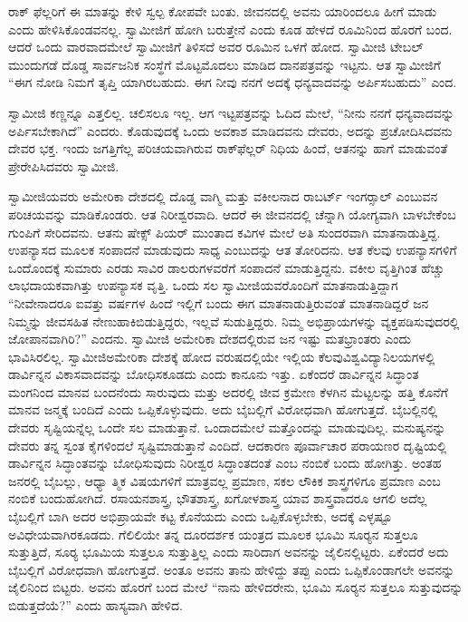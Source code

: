  ರಾಕ್ ಫೆಲ್ಲರಿಗೆ ಈ ಮಾತನ್ನು ಕೇಳಿ ಸ್ವಲ್ಪ ಕೋಪವೇ ಬಂತು. ಜೀವನದಲ್ಲಿ ಅವನು ಯಾರಿಂದಲೂ ಹೀಗೆ ಮಾಡು ಎಂದು ಹೇಳಿಸಿಕೊಂಡವನಲ್ಲ. ಸ್ವಾಮೀಜಿಗೆ ಹೋಗಿ ಬರುತ್ತೇನೆ ಎಂದು ಕೂಡ ಹೇಳದೆ ರೂಮಿನಿಂದ ಹೊರಗೆ ಬಂದ. ಆದರೆ ಒಂದು ವಾರವಾದಮೇಲೆ ಸ್ವಾಮೀಜಿಗೆ ತಿಳಿಸದೆ ಅವರ ರೂಮಿನ ಒಳಗೆ ಹೋದ. ಸ್ವಾಮೀಜಿ ಟೇಬಲ್ ಮುಂದುಗಡೆ ದೊಡ್ಡ ಸಾರ್ವಜನಿಕ ಸಂಸ್ಥೆಗೆ ಮೊಟ್ಟಮೊದಲು ಮಾಡಿದ ದಾನಪತ್ರವನ್ನು ಇಟ್ಟನು. ಆತ ಸ್ವಾಮೀಜಿಗೆ “ಈಗ ನೋಡಿ ನಿಮಗೆ ತೃಪ್ತಿ ಯಾಗಿರಬಹುದು. ಈಗ ನೀವು ನನಗೆ ಅದಕ್ಕೆ ಧನ್ಯವಾದವನ್ನು ಅರ್ಪಿಸಬಹುದು” ಎಂದ. 

 ಸ್ವಾಮೀಜಿ ಕಣ್ಣನ್ನೂ ಎತ್ತಲಿಲ್ಲ. ಚಲಿಸಲೂ ಇಲ್ಲ. ಆಗ ಇಟ್ಟಪತ್ರವನ್ನು ಓದಿದ ಮೇಲೆ, “ನೀನು ನನಗೆ ಧನ್ಯವಾದವನ್ನು ಅರ್ಪಿಸಬೇಕಾಗಿದೆ” ಎಂದರು. ಕೊಡುವುದಕ್ಕೆ ಒಂದು ಅವಕಾಶ ಮಾಡಿದವನು ದೇವರು, ಅದನ್ನು ಪ್ರಚೋದಿಸಿದವನು ದೇವರ ಭಕ್ತ. ಇಂದು ಜಗತ್ತಿಗೆಲ್ಲ ಪರಿಚಯವಾಗಿರುವ ರಾಕ್‍ಫೆಲ್ಲರ್ ನಿಧಿಯ ಹಿಂದೆ, ಆತನನ್ನು ಹಾಗೆ ಮಾಡುವಂತೆ ಪ್ರೇರೇಪಿಸಿದವರು ಸ್ವಾಮೀಜಿ. 

 ಸ್ವಾಮೀಜಿಯವರು ಅಮೇರಿಕಾ ದೇಶದಲ್ಲಿ ದೊಡ್ಡ ವಾಗ್ಮಿ ಮತ್ತು ವಕೀಲನಾದ ರಾಬರ್ಟ್ ಇಂಗರ್‍ಸಾಲ್ ಎಂಬುವನ ಪರಿಚಯವನ್ನು ಮಾಡಿಕೊಂಡರು. ಆತ ನಿರೀಶ್ವರವಾದಿ. ಆದರೆ ಈ ಜೀವನದಲ್ಲಿ ಚೆನ್ನಾಗಿ ಯೋಗ್ಯವಾಗಿ ಬಾಳಬೇಕೆಂಬ ಗುಂಪಿಗೆ ಸೇರಿದವನು. ಆತನು ಷೇಕ್ಸ್ ಪಿಯರ್ ಮುಂತಾದ ಕವಿಗಳ ಮೇಲೆ ಅತಿ ಸುಂದರವಾಗಿ ಮಾತನಾಡುತ್ತಿದ್ದ. ಉಪನ್ಯಾಸದ ಮೂಲಕ ಸಂಪಾದನೆ ಮಾಡುವುದು ಸಾಧ್ಯ ಎಂಬುದನ್ನು ಆತ ತೋರಿದನು. ಆತ ಕೆಲವು ಉಪನ್ಯಾಸಗಳಿಗೆ ಒಂದೊಂದಕ್ಕೆ ಸುಮಾರು ಎರಡು ಸಾವಿರ ಡಾಲರುಗಳವರೆಗೆ ಸಂಪಾದನೆ ಮಾಡುತ್ತಿದ್ದನು. ವಕೀಲ ವೃತ್ತಿಗಿಂತ ಹೆಚ್ಚು ಲಾಭದಾಯಕವಾಗಿತ್ತು ಉಪನ್ಯಾಸಕ ವೃತ್ತಿ. ಒಂದು ಸಲ ಸ್ವಾಮೀಜಿಯವರೊಂದಿಗೆ ಮಾತನಾಡುತ್ತಿದ್ದಾಗ “ನೀವೇನಾದರೂ ಐವತ್ತು ವರ್ಷಗಳ ಹಿಂದೆ ಇಲ್ಲಿಗೆ ಬಂದು ಈಗ ಮಾತನಾಡುತ್ತಿರುವಂತೆ ಮಾತನಾಡಿದ್ದರೆ ಜನ ನಿಮ್ಮನ್ನು ಜೀವಸಹಿತ ನೇಣುಹಾಕಿಬಿಡುತ್ತಿದ್ದರು, ಇಲ್ಲವೆ ಸುಡುತ್ತಿದ್ದರು. ನಿಮ್ಮ ಅಭಿಪ್ರಾಯಗಳನ್ನು ವ್ಯಕ್ತಪಡಿಸುವುದರಲ್ಲಿ ಜೋಪಾನವಾಗಿರಿ?” ಎಂದನು. ಸ್ವಾಮೀಜಿ ಅಮೇರಿಕಾ ದೇಶದಲ್ಲಿರುವ ಜನ ಇಷ್ಟು ಮತಭ್ರಾಂತರು ಎಂದು ಭಾವಿಸಿರಲಿಲ್ಲ. ಸ್ವಾಮೀಜಿ\break ಅಮೇರಿಕಾ ದೇಶಕ್ಕೆ ಹೋದ ವರುಷದಲ್ಲಿಯೇ ಇಲ್ಲಿಯ ಕೆಲವು\break ವಿಶ್ವವಿದ್ಯಾನಿಲಯಗಳಲ್ಲಿ ಡಾರ್ವಿನ್ನನ ವಿಕಾಸವಾದವನ್ನು ಬೋಧಿಸಕೂಡದು ಎಂದು ಕಾನೂನು ಇತ್ತು. ಏಕೆಂದರೆ ಡಾರ್ವಿನ್ನನ ಸಿದ್ಧಾಂತ ಮಂಗನಿಂದ ಮಾನವ ಬಂದನೆಂದು ಸಾರುವುದು ಮತ್ತು ಅದರಲ್ಲಿ ಜೀವ ಕ್ರಮೇಣ ಕೆಳಗಿನ ಮೆಟ್ಟಲನ್ನು ಹತ್ತಿ ಕೊನೆಗೆ ಮಾನವ ಜನ್ಮಕ್ಕೆ ಬಂದಿದೆ ಎಂದು ಒಪ್ಪಿಕೊಳ್ಳುವುದು. ಅದು ಬೈಬಲ್ಲಿಗೆ ವಿರೋಧವಾಗಿ ಹೋಗುತ್ತದೆ. ಬೈಬಲ್ಲಿನಲ್ಲಿ ದೇವರು ಸೃಷ್ಟಿಯನ್ನೆಲ್ಲ ಒಂದೇ ಸಲ ಮಾಡುತ್ತಾನೆ. ಒಂದಾದಮೇಲೆ ಮತ್ತೊಂದನ್ನು ಮಾಡುವುದಿಲ್ಲ. ಮನುಷ್ಯನನ್ನು ದೇವರು ತನ್ನ ಸ್ವಂತ ಕೈಗಳಿಂದಲೆ ಸೃಷ್ಟಿಮಾಡುತ್ತಾನೆ ಎಂದಿದೆ. ಆದಕಾರಣ ಪೂರ್ವಾಚಾರ ಪರಾಯಣರ ದೃಷ್ಟಿಯಲ್ಲಿ ಡಾರ್ವಿನ್ನನ ಸಿದ್ಧಾಂತವನ್ನು ಬೋಧಿಸುವುದು ನಿರೀಶ್ವರ ಸಿದ್ಧಾಂತದಂತೆ ಎಂಬ ನಂಬಿಕೆ ಬಂದು ಹೋಗಿತ್ತು. ಅಂತಹ ಜನರಲ್ಲಿ ಬೈಬಲ್ಲು, ಆಧ್ಯಾ ತ್ಮಿಕ ವಿಷಯಗಳಿಗೆ ಮಾತ್ರವಲ್ಲ ಪ್ರಮಾಣ, ಸಕಲ ಲೌಕಿಕ ಶಾಸ್ತ್ರಗಳಿಗೂ ಪ್ರಮಾಣ ಎಂಬ ನಂಬಿಕೆ ಬಂದುಹೋಗಿದೆ. ರಸಾಯನಶಾಸ್ತ್ರ, ಭೌತಶಾಸ್ತ್ರ, ಖಗೋಳಶಾಸ್ತ್ರ ಯಾವ ಶಾಸ್ತ್ರವಾದರೂ ಆಗಲಿ ಅದೆಲ್ಲ ಬೈಬಲ್ಲಿಗೆ ಬಾಗಿ ಅದರ ಅಭಿಪ್ರಾಯವೇ ಕಟ್ಟ ಕೊನೆಯದು ಎಂದು ಒಪ್ಪಿಕೊಳ್ಳಬೇಕು, ಅದಕ್ಕೆ ಎಳ್ಳಷ್ಟೂ ಅವಿಧೇಯವಾಗಿರಕೂಡದು. ಗೆಲಿಲಿಯೇ ತನ್ನ ದೂರದರ್ಶಕ ಯಂತ್ರದ ಮೂಲಕ ಭೂಮಿ ಸೂರ‍್ಯನ ಸುತ್ತಲೂ ಸುತ್ತುತ್ತಿದೆ, ಸೂರ‍್ಯ ಭೂಮಿಯ ಸುತ್ತಲೂ ಸುತ್ತುತ್ತಿಲ್ಲ ಎಂದು ಸಾರಿದಾಗ ಅವನನ್ನು ಜೈಲಿನಲ್ಲಿಟ್ಟರು. ಏಕೆಂದರೆ ಅದು ಬೈಬಲ್ಲಿಗೆ ವಿರೋಧವಾಗಿ ಹೋಗುತ್ತದೆ. ಅಂತೂ ಅವನು ತಾನು ಹೇಳಿದ್ದು ತಪ್ಪು ಎಂದು ಒಪ್ಪಿಕೊಂಡಾಗಲೇ ಅವನನ್ನು ಜೈಲಿನಿಂದ ಬಿಟ್ಟರು. ಅವನು ಹೊರಗೆ ಬಂದ ಮೇಲೆ “ನಾನು ಹೇಳಿದರೇನು, ಭೂಮಿ ಸೂರ‍್ಯನ ಸುತ್ತಲೂ ಸುತ್ತುವುದನ್ನು ಬಿಡುತ್ತದೆಯೆ?” ಎಂದು ಹಾಸ್ಯವಾಗಿ ಹೇಳಿದ. 

